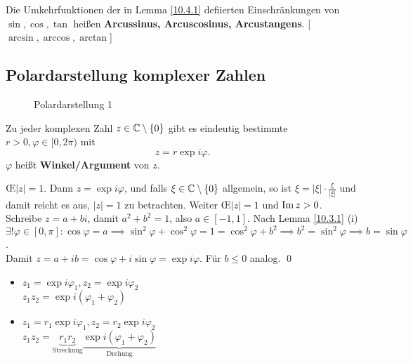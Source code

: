 \begin{subdefinition}
	Die Umkehrfunktionen der in Lemma \ref{10.4.1} defiierten Einschränkungen von $ \sin , \cos , \tan  $ heißen \textbf{Arcussinus, Arcuscosinus, Arcustangens}. [$ \arcsin , \arccos , \arctan $]
\end{subdefinition}

\newpage
\subsection{Polardarstellung komplexer Zahlen}
\begin{subtheorem}[Polardarstellung]
	\begin{figure}[H]
		\centering
		\caption{Polardarstellung 1}
		\label{Polardarstellung 1}
	\end{figure}
	Zu jeder komplexen Zahl $ z \in \mathbb{C} \setminus \left\{ 0 \right\}  $ gibt es eindeutig bestimmte $ r > 0, \varphi \in [0, 2\pi ) $ mit
	\[
		z = r \exp i\varphi.
	\]
	$ \varphi $ heißt \textbf{Winkel/Argument} von $ z $.
\end{subtheorem}
\begin{subproof*}
	\OE $ \left| z \right| = 1 $.
	Dann $ z = \exp i \varphi $, und falls $ \xi \in \mathbb{C} \setminus \left\{ 0 \right\}  $ allgemein, so ist $ \xi = \left| \xi \right| \cdot \frac{ \xi }{ \left| \xi \right|  }  $ und damit reicht es aus, $ \left| z \right| = 1 $ zu betrachten.
	Weiter \OE $ \left| z \right| = 1 $ und $ \operatorname{Im} z > 0 $.
	Schreibe $ z = a + bi $, damit $ a^2 + b^2 = 1 $, also $ a \in [-1, 1] $.
	Nach Lemma \ref{10.3.1} (i) $ \exists ! \varphi \in [0, \pi ]: \cos \varphi = a \implies \sin^2\varphi + \cos^2\varphi = 1 = \cos^2\varphi + b^2 \implies b^2 = \sin^2\varphi \implies b = \sin\varphi $.\\
	Damit $ z = a + ib = \cos \varphi + i \sin \varphi = \exp i\varphi $. Für $ b \leq 0 $ analog. \qed
\end{subproof*}

\begin{itemize}
	\item $ z_1 = \exp i\varphi_1, z_2 = \exp i\varphi_2 $\\
		$ z_1z_2 = \exp i\left( \varphi_1 + \varphi_2 \right) $
	\item $ z_1 = r_1\exp i\varphi_1, z_2 = r_2\exp i\varphi_2 $\\
		$ z_1z_2 = \underbrace{r_1r_2}_{\text{Streckung}} \underbrace{\exp i\left( \varphi_1 + \varphi_2 \right)}_{\text{Drehung}}  $
\end{itemize}


